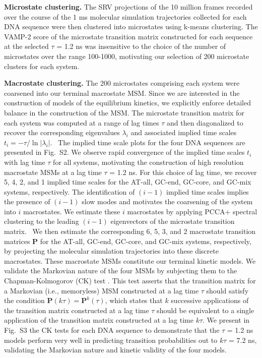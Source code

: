 \documentclass[journal=jpcbfk,manuscript=article]{achemso}
\newcommand*{\rood}[1]{{#1}}
\newcommand*{\blauw}[1]{{#1}}
\begin{document}
\textbf{Microstate clustering.} The SRV projections of the 10 million frames recorded over the course of the 1 ms molecular simulation trajectories collected for each DNA sequence were then clustered into microstates using k-means clustering. The VAMP-2 score of the microstate transition matrix constructed for each sequence at the selected $\tau$ = 1.2 ns was insensitive to the choice of the number of microstates over the range 100-1000, motivating our selection of 200 microstate clusters for each system.

\textbf{Macrostate clustering.} The 200 microstates comprising each system were coarsened into our terminal macrostate MSM.  \rood{Since we are interested in the construction of models of the equilibrium kinetics, we explicitly enforce detailed balance in the construction of the MSM. \citep{Wehmeyer2019IntroductionSoftware}} The microstate transition matrix for each system was computed at a range of lag times $\tau$ and then diagonalized to recover the corresponding eigenvalues $\lambda_i$ and associated implied time scales $t_i = -\tau / \ln \left| \lambda_i \right|$.~\citep{Wehmeyer2019IntroductionSoftware} The implied time scale plots for the four DNA sequences are presented in \blauw{Fig.~S2}. We observe rapid convergence of the implied time scales $t_i$ with lag time $\tau$ for all systems, motivating the construction of high resolution macrostate MSMs at a lag time $\tau$ = 1.2 ns. For this choice of lag time, we recover 5, 4, 2, and 1 implied time scales for the AT-all, GC-end, GC-core, and GC-mix systems, respectively. The identification of $(i-1)$ implied time scales implies the presence of $(i-1)$ slow modes and motivates the coarsening of the system into $i$ macrostates. We estimate these $i$ macrostates by applying PCCA+ spectral clustering to the leading $(i-1)$ eigenvectors of the microstate transition matrix.~\citep{Roblitz2013FuzzyClassification, Weber2018ImplicationsSimulation, Kube2007AConformations} We then estimate the corresponding 6, 5, 3, and 2 macrostate transition matrices $\mathbf{P}$ for the AT-all, GC-end, GC-core, and GC-mix systems, respectively, by projecting the molecular simulation trajectories into these discrete macrostates. These macrostate MSMs constitute our terminal kinetic models. We validate the Markovian nature of the four MSMs by subjecting them to the Chapman-Kolmogorov (CK) test \citep{Noe2009ConstructingSimulations,Prinz2011OptimalDynamics, Wehmeyer2019IntroductionSoftware}. This test asserts that the transition matrix for a Markovian (i.e., memoryless) MSM constructed at a lag time $\tau$ should satisfy the condition $\mathbf{P}(k \tau) = \mathbf{P}^k(\tau)$, which states that $k$ successive applications of the transition matrix constructed at a lag time $\tau$ should be equivalent to a single application of the transition matrix constructed at a lag time $k \tau$. We present in \blauw{Fig.~S3} the CK tests for each DNA sequence to demonstrate that the $\tau$ = 1.2 ns models perform very well in predicting transition probabilities out to $k \tau$ = 7.2 ns, validating the Markovian nature and kinetic validity of the four models.
\end{document}
